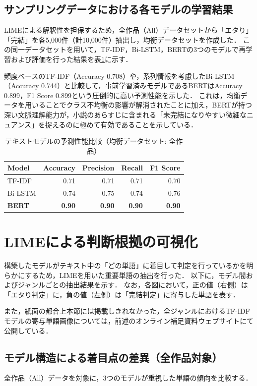 \documentclass[uplatex, dvipdfmx, 11pt, a4paper, report]{jsbook}
\begin{document}
\subsection{サンプリングデータにおける各モデルの学習結果}
LIMEによる解釈性を担保するため，全作品（All）データセットから「エタり」「完結」を各5,000件（計10,000件）抽出し，均衡データセットを作成した．
この同一データセットを用いて，TF-IDF，Bi-LSTM，BERTの3つのモデルで再学習および評価を行った結果を表\ref{tab:text_models_compare}に示す．

頻度ベースのTF-IDF（Accuracy 0.708）や，系列情報を考慮したBi-LSTM（Accuracy 0.744）と比較して，事前学習済みモデルであるBERTはAccuracy 0.899，F1 Score 0.899という圧倒的に高い予測性能を示した．
これは，均衡データを用いることでクラス不均衡の影響が解消されたことに加え，BERTが持つ深い文脈理解能力が，小説のあらすじに含まれる「未完結になりやすい微細なニュアンス」を捉えるのに極めて有効であることを示している．

\begin{table}[H]
  \centering
  \caption{テキストモデルの予測性能比較（均衡データセット: 全作品）}
  \label{tab:text_models_compare}
  \begin{tabular}{lrrrr} \hline
    Model & Accuracy & Precision & Recall & F1 Score \\ \hline
    TF-IDF & 0.71 & 0.71 & 0.71 & 0.70 \\
    Bi-LSTM & 0.74 & 0.75 & 0.74 & 0.76 \\
    \textbf{BERT} & \textbf{0.90} & \textbf{0.90} & \textbf{0.90} & \textbf{0.90} \\ \hline
  \end{tabular}
\end{table}

\section{LIMEによる判断根拠の可視化}
構築したモデルがテキスト中の「どの単語」に着目して判定を行っているかを明らかにするため，LIMEを用いた重要単語の抽出を行った．
以下に，モデル間およびジャンルごとの抽出結果を示す．
なお，各図において，正の値（右側）は「エタり判定」に，負の値（左側）は「完結判定」に寄与した単語を表す．

また，紙面の都合上本節には掲載しきれなかった，全ジャンルにおけるTF-IDFモデルの寄与単語画像については，前述のオンライン補足資料ウェブサイトにて公開している．

\subsection{モデル構造による着目点の差異（全作品対象）}
全作品（All）データを対象に，3つのモデルが重視した単語の傾向を比較する．
\end{document}
